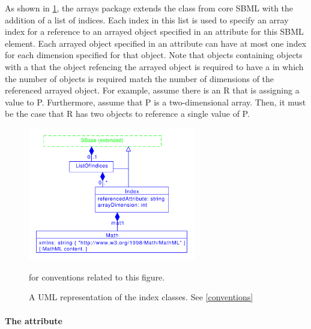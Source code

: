 As shown in \ref{fig:indices_uml}, the arrays package extends the \SBase class from core SBML with the addition of a list of indices.   Each index in this list is used to specify an array index for a reference to an arrayed object specified in an attribute for this SBML element.       Each arrayed object specified in an attribute can have at most one index for each dimension specified for that object.    
Note that \SBase objects containing   objects with a \ListOfDimensions that the
  object refencing the arrayed object is required to have  a \ListOfIndices in which the number of
  \Index objects is required match the number of dimensions of the referenced arrayed object. For example, assume there is an \AssignmentRule R that is assigning a value to \Parameter P. Furthermore, assume that P is a two-dimensional array.  Then, it must be the case that R has two \Index objects to reference a single value of P. 

\begin{figure}[tbhp]
    \centering
    \includegraphics[width=0.65\textwidth]{images/indicesUML.pdf}\\
    \caption{A UML representation of the index classes. See \ref{conventions}} for conventions related to this figure.  \label{fig:indices_uml}
\end{figure}

\paragraph{The  attribute}

